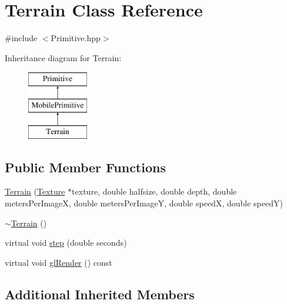 \hypertarget{class_terrain}{\section{Terrain Class Reference}
\label{class_terrain}
}


{\ttfamily \#include $<$Primitive.\-hpp$>$}

Inheritance diagram for Terrain\-:\begin{figure}[H]
\begin{center}
\leavevmode
\includegraphics[height=3.000000cm]{class_terrain}
\end{center}
\end{figure}
\subsection*{Public Member Functions}
\begin{DoxyCompactItemize}
\item 
\hyperlink{class_terrain_ac3699a5130564b98316c80f5586a4467}{Terrain} (\hyperlink{class_texture}{Texture} $\ast$texture, double halfsize, double depth, double meters\-Per\-Image\-X, double meters\-Per\-Image\-Y, double speed\-X, double speed\-Y)
\item 
\hyperlink{class_terrain_a2f7f0a2aee54886324ccf48a6f321de0}{$\sim$\-Terrain} ()
\item 
virtual void \hyperlink{class_terrain_a6e3b99c889dc601aa16feb05c7376c90}{step} (double seconds)
\item 
virtual void \hyperlink{class_terrain_a225b584a9979c6596b90294ef29ffe47}{gl\-Render} () const 
\end{DoxyCompactItemize}
\subsection*{Additional Inherited Members}


